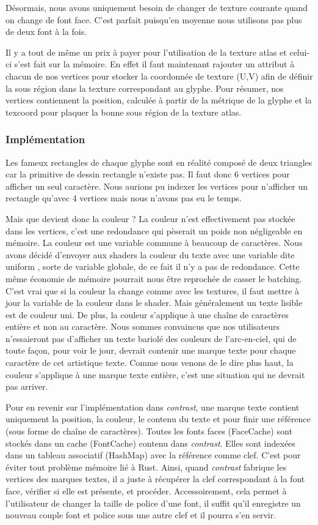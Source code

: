 \documentclass[12pt]{article}
\begin{document}
Désormais, nous avons uniquement besoin de changer de texture courante quand on change de font face. C'est parfait puisqu'en moyenne nous utilisons pas plus de deux font à la fois.

Il y a tout de même un prix à payer pour l'utilisation de la texture atlas et celui-ci s'est fait sur la mémoire. En effet il faut maintenant rajouter un attribut à chacun de nos vertices
pour stocker la coordonnée de texture (U,V) afin de définir la sous région dans la texture correspondant au glyphe. Pour résumer, nos vertices contiennent la position, calculée à partir de
la métrique de la glyphe et la texcoord pour plaquer la bonne sous région de la texture atlas.

\subsubsection{Implémentation}

Les fameux rectangles de chaque glyphe sont en réalité composé de deux triangles car la primitive de dessin rectangle n'existe pas. Il faut donc 6 vertices pour afficher un seul caractère.
Nous aurions pu indexer les vertices pour n'afficher un rectangle qu'avec 4 vertices mais nous n'avons pas eu le temps.

Mais que devient donc la couleur ? La couleur n'est effectivement pas stockée dans les vertices, c'est une redondance qui pèserait un poids non négligeable en mémoire. La couleur est une variable
commune à beaucoup de caractères. Nous avons décidé d'envoyer aux shaders la couleur du texte avec une variable dite \og uniform \fg{}, sorte de variable globale, de ce fait il n'y a pas de redondance.
Cette même économie de mémoire pourrait nous être reprochée de casser le batching. C'est vrai que si la couleur la change comme avec les textures, il faut mettre à jour la variable de la couleur
dans le shader. Mais généralement un texte lisible est de couleur uni. De plus, la couleur s'applique à une chaîne de caractères entière et non au caractère. Nous sommes convaincus que nos utilisateurs
n'essaieront pas d'afficher un texte bariolé des couleurs de l'arc-en-ciel, qui de toute façon, pour voir le jour, devrait contenir une marque texte pour chaque caractère de cet artistique texte.
Comme nous venons de le dire plus haut, la couleur s'applique à une marque texte entière, c'est une situation qui ne devrait pas arriver.

Pour en revenir sur l'implémentation dans \textit{contrast}, une marque texte contient uniquement la position, la couleur, le contenu du texte et pour finir une référence (sous forme
de chaîne de caractères). Toutes les fonts faces (FaceCache) sont stockés dans un cache (FontCache) contenu dans \textit{contrast}. Elles sont indexées dans un tableau associatif (HashMap) avec la référence
comme clef. C'est pour éviter tout problème mémoire lié à Rust. Ainsi, quand \textit{contrast} fabrique les vertices des marques textes, il a juste à récupérer la clef correspondant à la font face,
vérifier si elle est présente, et procéder. Accessoirement, cela permet à l'utilisateur de changer la taille de police d'une font, il suffit qu'il enregistre un nouveau couple font et police
sous une autre clef et il pourra s'en servir.
\end{document}

